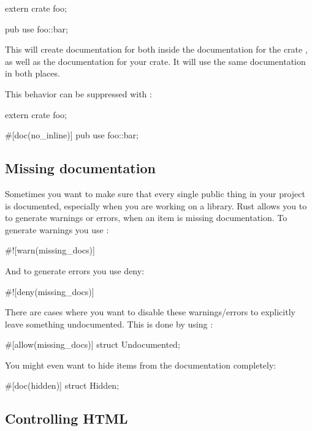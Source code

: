 \begin{rustc}
extern crate foo;

pub use foo::bar;
\end{rustc}

This will create documentation for  both inside the documentation for the crate , as well as the documentation 
for your crate. It will use the same documentation in both places.

\blank

This behavior can be suppressed with :

\begin{rustc}
extern crate foo;

#[doc(no_inline)]
pub use foo::bar;
\end{rustc}

\subsection*{Missing documentation}

Sometimes you want to make sure that every single public thing in your project is documented, especially when you are working on 
a library. Rust allows you to to generate warnings or errors, when an item is missing documentation. To generate warnings you use 
:

\begin{rustc}
#![warn(missing_docs)]
\end{rustc}

And to generate errors you use deny:

\begin{rustc}
#![deny(missing_docs)]
\end{rustc}

There are cases where you want to disable these warnings/errors to explicitly leave something undocumented. This is done by using :

\begin{rustc}
#[allow(missing_docs)]
struct Undocumented;
\end{rustc}

You might even want to hide items from the documentation completely:

\begin{rustc}
#[doc(hidden)]
struct Hidden;
\end{rustc}

\subsection*{Controlling HTML}

